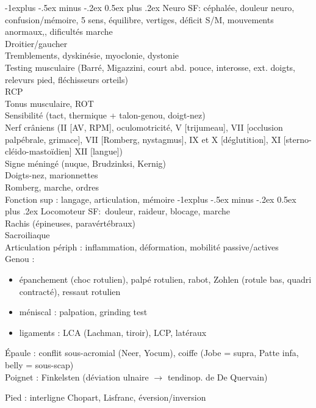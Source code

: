 \documentclass[a5paper,12pt,norsk]{article}
\makeatletter
\renewcommand{\subsection}{\@startsection{subsection}{2}{0mm}%
                                {-1explus -.5ex minus -.2ex}%
                                {0.5ex plus .2ex}%
                                {\normalfont\normalsize\bfseries}}
\makeatother
\begin{document}
\subsection{Neuro}
SF: céphalée, douleur neuro, confusion/mémoire, 5 sens, équilibre, vertiges,
déficit S/M, mouvements anormaux,, dificultés marche\\
Droitier/gaucher\\
Tremblements, dyskinésie, myoclonie, dystonie\\
Testing musculaire (Barré, Migazzini, court abd. pouce, interosse, ext. doigts,
relevurs pied, fléchisseurs orteils)\\
RCP\\
Tonus musculaire, ROT\\
Sensibilité (tact, thermique + talon-genou, doigt-nez)\\
Nerf crâniens (II [AV, RPM], oculomotricité, V [trijumeau], VII [occlusion palpébrale, grimace], VII [Romberg, nystagmus], IX et X [déglutition], XI [sterno-cléido-mastoïdien] XII [langue])\\
Signe méningé (nuque, Brudzinksi, Kernig)\\
Doigts-nez, marionnettes\\
Romberg, marche, ordres\\
Fonction sup : langage, articulation, mémoire
\subsection{Locomoteur}
SF: douleur, raideur, blocage, marche\\
Rachis (épineuses, paravértébraux)\\
Sacroiliaque\\
Articulation périph : inflammation, déformation, mobilité passive/actives\\
Genou :
\begin{itemize}
\item épanchement (choc rotulien), palpé rotulien, rabot, Zohlen (rotule bas, quadri contracté), ressaut rotulien
\item méniscal : palpation, grinding test
\item ligaments : LCA (Lachman, tiroir), LCP, latéraux
\end{itemize}
Épaule : conflit sous-acromial (Neer, Yocum), coiffe (Jobe = supra, Patte  infa, belly = sous-scap)\\
Poignet : Finkelsten (déviation ulnaire $\rightarrow$ tendinop. de De Quervain)

Pied : interligne Chopart, Lisfranc, éversion/inversion
\end{document}
